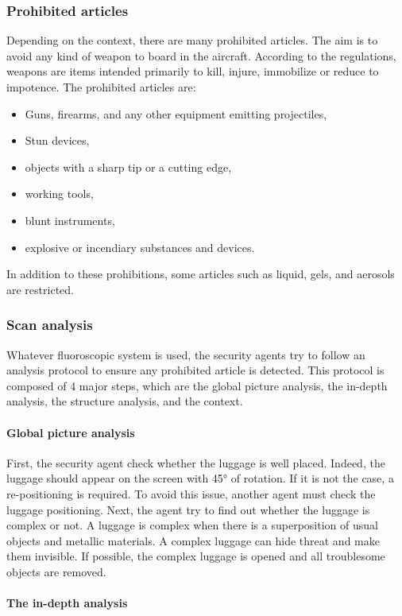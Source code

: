\subsubsection{Prohibited articles}
Depending on the context, there are many prohibited articles. The aim is to avoid any kind of weapon to board in the aircraft. According to the regulations, weapons are items intended primarily to kill, injure, immobilize or reduce to impotence. The prohibited articles are:
\begin{itemize}
\item Guns, firearms, and any other equipment emitting projectiles,
\item Stun devices,
\item objects with a sharp tip or a cutting edge,
\item working tools,
\item blunt instruments,
\item explosive or incendiary substances and devices.
\end{itemize}
In addition to these prohibitions, some articles such as liquid, gels, and aerosols are restricted.

\subsubsection{Scan analysis}
Whatever fluoroscopic system is used, the security agents try to follow an analysis protocol to ensure any prohibited article is detected. This protocol is composed of 4 major steps, which are the global picture analysis, the in-depth analysis, the structure analysis, and the context.

\paragraph{Global picture analysis}


First, the security agent check whether the luggage is well placed. Indeed, the luggage should appear on the screen with \ang{45} of rotation. If it is not the case, a re-positioning is required. To avoid this issue, another agent must check the luggage positioning.
Next, the agent try to find out whether the luggage is complex or not. A luggage is complex when there is a superposition of usual objects and metallic materials. A complex luggage can hide threat and make them invisible. If possible, the complex luggage is opened and all troublesome objects are removed.

\paragraph{The in-depth analysis}


